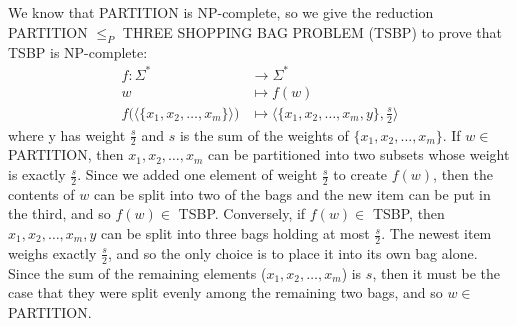 \documentclass{article}
\begin{document}
\section{} %
We know that PARTITION is NP-complete, so we give the reduction PARTITION $\le_P$
THREE SHOPPING BAG PROBLEM (TSBP) to prove that TSBP is NP-complete:
\begin{align*}
	f:\Sigma^*&\longrightarrow\Sigma^*\\
	w&\longmapsto f(w)\\
	f\Big(\Big\langle\{x_1,x_2,\ldots,x_m\}\Big\rangle\Big)&\longmapsto
		\Big\langle\{x_1,x_2,\ldots,x_m,y\},\frac{s}{2}\Big\rangle
\end{align*}
where y has weight $\frac{s}{2}$ and $s$ is the sum of the weights of
$\{x_1,x_2,\ldots,x_m\}$.
\newline
\newline
If $w\in$ PARTITION, then $x_1,x_2,\ldots,x_m$ can be partitioned into two
subsets whose weight is exactly $\frac{s}{2}$. Since we added one element of
weight $\frac{s}{2}$ to create $f(w)$, then the contents of $w$ can be split
into two of the bags and the new item can be put in the third, and so $f(w)\in$
TSBP. Conversely, if $f(w)\in$ TSBP, then $x_1,x_2,\ldots,x_m,y$ can be split
into three bags holding at most $\frac{s}{2}$. The newest item weighs exactly
$\frac{s}{2}$, and so the only choice is to place it into its own bag alone.
Since the sum of the remaining elements ($x_1,x_2,\ldots,x_m$) is $s$, then it
must be the case that they were split evenly among the remaining two bags, and
so $w\in$ PARTITION.
\end{document}

